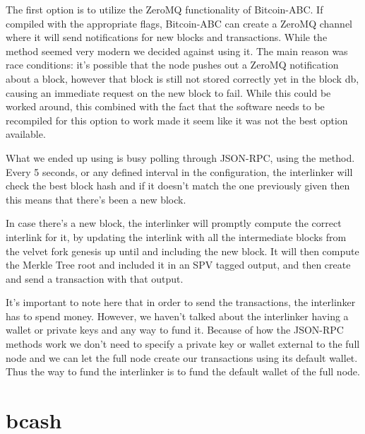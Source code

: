 The first option is to utilize the ZeroMQ functionality of Bitcoin-ABC. If compiled with the appropriate flags, Bitcoin-ABC can create a ZeroMQ channel where it will send notifications for new blocks and transactions. While the method seemed very modern we decided against using it. The main reason was race conditions: it's possible that the node pushes out a ZeroMQ notification about a block, however that block is still not stored correctly yet in the block db, causing an immediate  request on the new block to fail. While this could be worked around, this combined with the fact that the software needs to be recompiled for this option to work made it seem like it was not the best option available.

What we ended up using is busy polling through JSON-RPC, using the  method. Every 5 seconds, or any defined interval in the configuration, the interlinker will check the best block hash and if it doesn't match the one previously given then this means that there's been a new block.

In case there's a new block, the interlinker will promptly compute the correct interlink for it, by updating the interlink with all the intermediate blocks from the velvet fork genesis up until and including the new block. It will then compute the Merkle Tree root and included it in an SPV tagged output, and then create and send a transaction with that output.

It's important to note here that in order to send the transactions, the interlinker has to spend money. However, we haven't talked about the interlinker having a wallet or private keys and any way to fund it. Because of how the JSON-RPC methods work we don't need to specify a private key or wallet external to the full node and we can let the full node create our transactions using its default wallet. Thus the way to fund the interlinker is to fund the default wallet of the full node.

\section{bcash}
